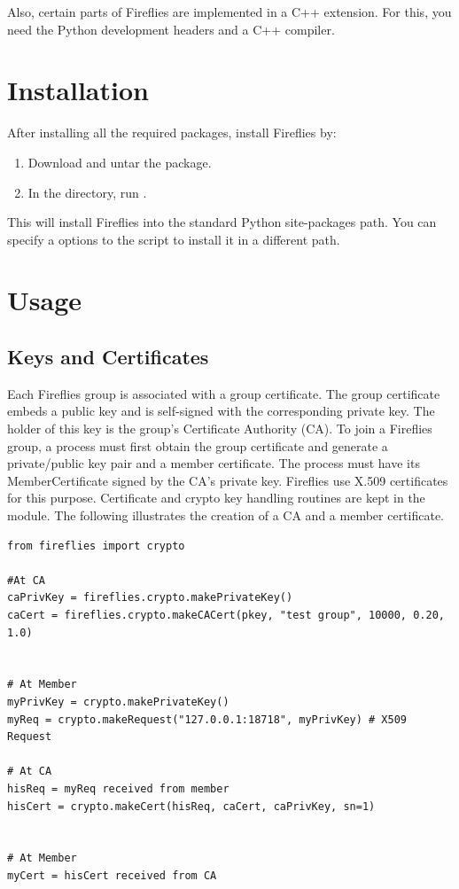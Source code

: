 \documentclass{howto}
\begin{document}
Also, certain parts of Fireflies are implemented in a C++ extension.
For this, you need the Python development headers and a C++ compiler. 


\section{Installation}

After installing all the required packages, install Fireflies by:
%
\begin{enumerate}
\item Download  and untar the package.
\item In the  directory, run .  
\end{enumerate}
%

This will install Fireflies into the standard Python site-packages
path. You can specify a  options to the
 script to install it in a different path.


\section{Usage}

\subsection{Keys and Certificates}

Each Fireflies group is associated with a group certificate.  The
group certificate embeds a public key and is self-signed with the
corresponding private key.  The holder of this key is the group's
Certificate Authority (CA).  To join a Fireflies group, a process must
first obtain the group certificate and generate a private/public key
pair and a member certificate.  The process must have its
MemberCertificate signed by the CA's private key.  Fireflies use X.509
certificates for this purpose.  Certificate and crypto key handling
routines are kept in the  module.  The
following illustrates the creation of a CA and a member certificate.

\begin{verbatim}
from fireflies import crypto

#At CA
caPrivKey = fireflies.crypto.makePrivateKey()
caCert = fireflies.crypto.makeCACert(pkey, "test group", 10000, 0.20, 1.0)


# At Member
myPrivKey = crypto.makePrivateKey()
myReq = crypto.makeRequest("127.0.0.1:18718", myPrivKey) # X509 Request

# At CA
hisReq = myReq received from member
hisCert = crypto.makeCert(hisReq, caCert, caPrivKey, sn=1)


# At Member
myCert = hisCert received from CA
\end{verbatim}
\end{document}
